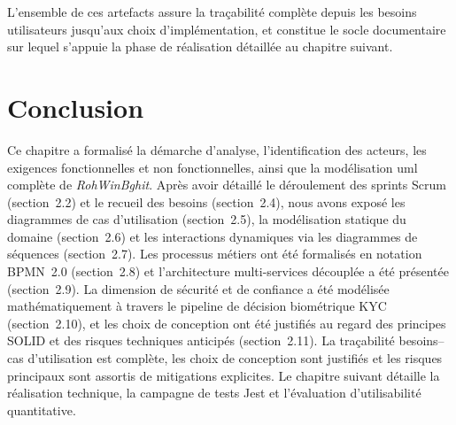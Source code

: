 L'ensemble de ces artefacts assure la traçabilité complète depuis les besoins utilisateurs jusqu'aux choix d'implémentation, et constitue le socle documentaire sur lequel s'appuie la phase de réalisation détaillée au chapitre suivant.

\section{Conclusion}

Ce chapitre a formalisé la démarche d'analyse, l'identification des acteurs, les exigences fonctionnelles et non fonctionnelles, ainsi que la modélisation \gls{uml} complète de \textit{RohWinBghit}. Après avoir détaillé le déroulement des sprints Scrum (section~2.2) et le recueil des besoins (section~2.4), nous avons exposé les diagrammes de cas d'utilisation (section~2.5), la modélisation statique du domaine (section~2.6) et les interactions dynamiques via les diagrammes de séquences (section~2.7). Les processus métiers ont été formalisés en notation BPMN~2.0 (section~2.8) et l'architecture multi-services découplée a été présentée (section~2.9). La dimension de sécurité et de confiance a été modélisée mathématiquement à travers le pipeline de décision biométrique KYC (section~2.10), et les choix de conception ont été justifiés au regard des principes SOLID et des risques techniques anticipés (section~2.11). La traçabilité besoins--cas d'utilisation est complète, les choix de conception sont justifiés et les risques principaux sont assortis de mitigations explicites. Le chapitre suivant détaille la réalisation technique, la campagne de tests Jest et l'évaluation d'utilisabilité quantitative.

